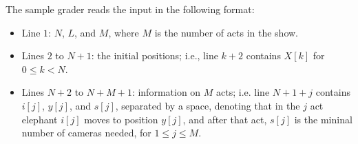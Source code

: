 The sample grader reads the input in the following format:

\begin{itemize}
\item Line $1$: $N$, $L$, and $M$, where $M$ is the number of acts in the show.
\item Lines $2$ to $N+1$: the initial positions; i.e., line $k+2$ contains $X[k]$ for $0 \le k < N$.
\item Lines $N+2$ to $N+M+1$: information on $M$ acts; i.e. line $N+1+j$ contains $i[j]$, $y[j]$, and $s[j]$, separated by a space, denoting that in the $j$ act elephant $i[j]$ moves to position $y[j]$, and after that act, $s[j]$ is the mininal number of cameras needed, for $1 \le j \le M$. 
\end{itemize}